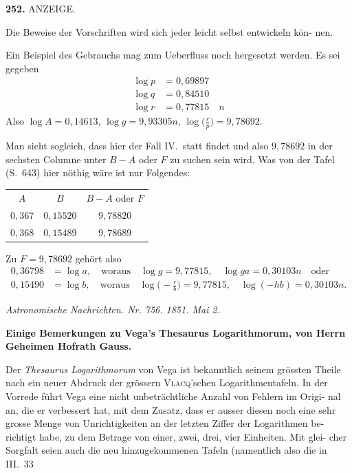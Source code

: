 \documentclass[12pt,a4paper]{article}
\begin{document}
\newpage
\noindent\textbf{252.}\quad
ANZEIGE.

\smallskip\noindent
Die Beweise der Vorschriften wird sich jeder leicht selbst entwickeln kön-
nen.

\smallskip\noindent
Ein Beispiel des Gebrauchs mag zum Ueberfluss noch hergesetzt werden.
Es sei gegeben
\begin{align*}
\log p &= 0{,}69897 \\
\log q &= 0{,}84510 \\
\log r &= 0{,}77815 \quad n
\end{align*}
Also $\log A = 0{,}14613$, $\log g = 9{,}93305n$, $\log\bigl(\frac{r}{p}\bigr) = 9{,}78692$.

\smallskip\noindent
Man sieht sogleich, dass hier der Fall IV.\ statt findet und also $9{,}78692$ in
der sechsten Columne unter $B-A$ oder $F$ zu suchen sein wird. Was von der
Tafel (S.~643) hier nöthig wäre ist nur Folgendes:
\begin{center}
\begin{tabular}{@{}c|c|c@{}}
$A$ & $B$ & $B-A$ oder $F$ \\[2pt]
$0{,}367$ & $0{,}15520$ & $9{,}78820$ \\
$0{,}368$ & $0{,}15489$ & $9{,}78689$
\end{tabular}
\end{center}

\smallskip\noindent
Zu $F = 9{,}78692$ gehört also
\begin{align*}
0{,}36798 &= \log a, \quad \text{woraus} \quad \log g = 9{,}77815, \quad \log ga = 0{,}30103n \quad \text{oder}\\
0{,}15490 &= \log b, \quad \text{woraus} \quad \log\bigl(-\tfrac{r}{b}\bigr) = 9{,}77815, \quad \log(-hb) = 0{,}30103n.
\end{align*}

\bigskip
\noindent\textit{Astronomische Nachrichten. Nr. 756. 1851. Mai 2.}

\smallskip\noindent
\textbf{Einige Bemerkungen zu Vega's Thesaurus Logarithmorum, von Herrn}
\textbf{Geheimen Hofrath Gauss.}

\smallskip\noindent
Der \textit{Thesaurus Logarithmorum} von Vega ist bekanntlich seinem grössten
Theile nach ein neuer Abdruck der grössern \textsc{Vlacq}'schen Logarithmentafeln. In
der Vorrede führt Vega eine nicht unbeträchtliche Anzahl von Fehlern im Origi-
nal an, die er verbessert hat, mit dem Zusatz, dass er ausser diesen noch eine
sehr grosse Menge von Unrichtigkeiten an der letzten Ziffer der Logarithmen be-
richtigt habe, zu dem Betrage von einer, zwei, drei, vier Einheiten. Mit glei-
cher Sorgfalt seien auch die neu hinzugekommenen Tafeln (namentlich also die in
III.\ 33
\end{document}
